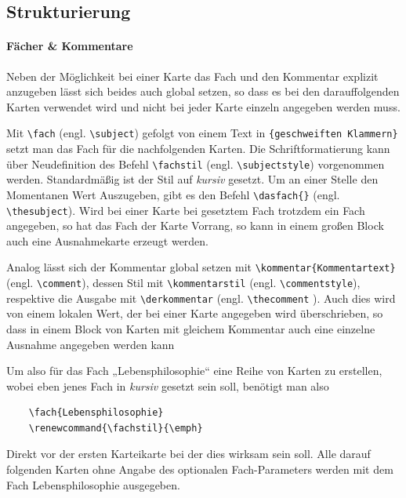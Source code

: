 \documentclass[a4paper]{article}
\begin{document}
\subsection{Strukturierung}\label{subsec:Struktur}
\paragraph{Fächer \& Kommentare}
Neben der Möglichkeit bei einer Karte das Fach und den Kommentar explizit anzugeben lässt sich beides auch global setzen, so dass es bei den darauffolgenden Karten verwendet wird und nicht bei jeder Karte einzeln angegeben werden muss.

Mit \lstinline!\fach! (engl. \lstinline!\subject!) gefolgt von einem Text in \lstinline!{geschweiften Klammern}! setzt man das Fach für die nachfolgenden Karten. Die Schriftformatierung kann über Neudefinition des Befehl \lstinline!\fachstil! (engl. \lstinline!\subjectstyle!) vorgenommen werden. Standardmäßig ist der Stil auf \emph{kursiv} gesetzt. Um an einer Stelle den Momentanen Wert Auszugeben, gibt es den Befehl \lstinline!\dasfach{}! (engl. \lstinline!\thesubject!). Wird bei einer Karte bei gesetztem Fach trotzdem ein Fach angegeben, so hat das Fach der Karte Vorrang, so kann in einem großen Block auch eine Ausnahmekarte erzeugt werden.

Analog lässt sich der Kommentar global setzen mit \lstinline!\kommentar{Kommentartext}! (engl. \lstinline!\comment!), dessen Stil mit \lstinline!\kommentarstil! (engl. \lstinline!\commentstyle!), respektive die Ausgabe mit \lstinline!\derkommentar! (engl. \lstinline!\thecomment! ). Auch dies wird von einem lokalen Wert, der bei einer Karte angegeben wird überschrieben, so dass in einem Block von Karten mit gleichem Kommentar auch eine einzelne Ausnahme angegeben werden kann

Um also für das Fach „Lebensphilosophie“ eine Reihe von Karten zu erstellen, wobei eben jenes Fach in \emph{kursiv} gesetzt sein soll, benötigt man also
\begin{lstlisting}
	\fach{Lebensphilosophie}
	\renewcommand{\fachstil}{\emph}
\end{lstlisting}
Direkt vor der ersten Karteikarte bei der dies wirksam sein soll. Alle darauf folgenden Karten ohne Angabe des optionalen Fach-Parameters werden mit dem Fach Lebensphilosophie ausgegeben.
\end{document}
